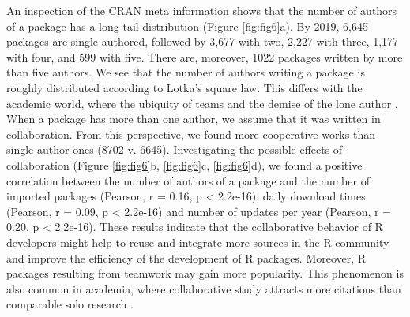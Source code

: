 An inspection of the CRAN meta information shows that the number of
authors of a package has a long-tail distribution (Figure
\ref{fig:fig6}a). By 2019, 6,645 packages are single-authored, followed
by 3,677 with two, 2,227 with three, 1,177 with four, and 599 with five.
There are, moreover, 1022 packages written by more than five authors. We
see that the number of authors writing a package is roughly distributed
according to Lotka's square law. This differs with the academic world,
where the ubiquity of teams and the demise of the lone author
\citep{WuchtyJones-607}. When a package has more than one author, we
assume that it was written in collaboration. From this perspective, we
found more cooperative works than single-author ones (8702 v. 6645).
Investigating the possible effects of collaboration (Figure
\ref{fig:fig6}b, \ref{fig:fig6}c, \ref{fig:fig6}d), we found a positive
correlation between the number of authors of a package and the number of
imported packages (Pearson, r = 0.16, p \textless{} 2.2e-16), daily
download times (Pearson, r = 0.09, p \textless{} 2.2e-16) and number of
updates per year (Pearson, r = 0.20, p \textless{} 2.2e-16). These
results indicate that the collaborative behavior of R developers might
help to reuse and integrate more sources in the R community and improve
the efficiency of the development of R packages. Moreover, R packages
resulting from teamwork may gain more popularity. This phenomenon is
also common in academia, where collaborative study attracts more
citations than comparable solo research \citep{WuchtyJones-607}.

